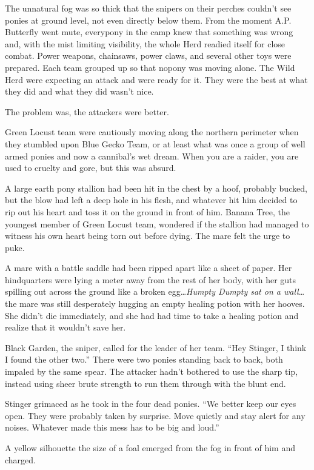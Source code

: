 The unnatural fog was so thick that the snipers on their perches couldn't see ponies at ground level, not even directly below them. From the moment A.P. Butterfly went mute, everypony in the camp knew that something was wrong and, with the mist limiting visibility, the whole Herd readied itself for close combat. Power weapons, chainsaws, power claws, and several other toys were prepared. Each team grouped up so that nopony was moving alone. The Wild Herd were expecting an attack and were ready for it. They were the best at what they did and what they did wasn't nice.

The problem was, the attackers were better.

Green Locust team were cautiously moving along the northern perimeter when they stumbled upon Blue Gecko Team, or at least what was once a group of well armed ponies and now a cannibal's wet dream. When you are a raider, you are used to cruelty and gore, but this was absurd.

A large earth pony stallion had been hit in the chest by a hoof, probably bucked, but the blow had left a deep hole in his flesh, and whatever hit him decided to rip out his heart and toss it on the ground in front of him. Banana Tree, the youngest member of Green Locust team, wondered if the stallion had managed to witness his own heart being torn out before dying. The mare felt the urge to puke.

A mare with a battle saddle had been ripped apart like a sheet of paper. Her hindquarters were lying a meter away from the rest of her body, with her guts spilling out across the ground like a broken egg\dots \emph{Humpty Dumpty sat on a wall}\/\dots the mare was still desperately hugging an empty healing potion with her hooves. She didn't die immediately, and she had had time to take a healing potion and realize that it wouldn't save her.

Black Garden, the sniper, called for the leader of her team. ``Hey Stinger, I think I found the other two.'' There were two ponies standing back to back, both impaled by the same spear. The attacker hadn't bothered to use the sharp tip, instead using sheer brute strength to run them through with the blunt end.

Stinger grimaced as he took in the four dead ponies. ``We better keep our eyes open. They were probably taken by surprise. Move quietly and stay alert for any noises. Whatever made this mess has to be big and loud.''

A yellow silhouette the size of a foal emerged from the fog in front of him and charged.



